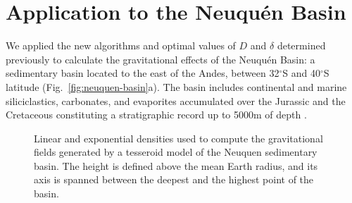 \documentclass[extra, referee]{gji}
\begin{document}

\section{Application to the Neuqu\'en Basin}

We applied the new algorithms and optimal values of $D$ and $\delta$ determined
previously to calculate the gravitational effects of the Neuqu\'en Basin:
a sedimentary basin
located to the east of the Andes, between 32$^\circ$S and 40$^\circ$S latitude
(Fig.~\ref{fig:neuquen-basin}a).
The basin includes continental and marine siliciclastics, carbonates, and evaporites
accumulated over the Jurassic and the Cretaceous constituting a stratigraphic record up
to 5000m of depth \citep{Howell2005}.

\begin{figure}
\centering
{}
\caption{
    Linear and exponential densities used to compute the gravitational fields generated
    by a tesseroid model of the Neuquen sedimentary basin.
    The height is defined above the mean Earth radius, and its axis is spanned between
    the deepest and the highest point of the basin.
}
\label{fig:neuquen-basin-densities}
\end{figure}
\end{document}
